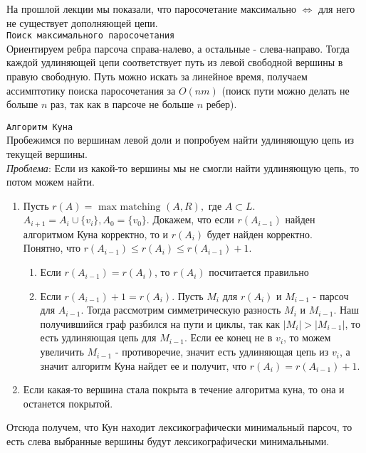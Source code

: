 \documentclass{article}
\newcommand{\ti}[1]{\textit{#1}}
\newcommand{\abs}[1]{\left|{#1}\right|}
\begin{document}
На прошлой лекции мы показали, что паросочетание максимально $\Leftrightarrow$ для него не существует дополняющей цепи. \\

\verb'Поиск максимального паросочетания' \\
Ориентируем ребра парсоча справа-налево, а остальные - слева-направо. Тогда каждой удлиняющей цепи соответствует путь из левой свободной вершины в правую свободную. Путь можно искать за линейное время, получаем ассимптотику поиска паросочетания за $O(nm)$ (поиск пути можно делать не больше $n$ раз, так как в парсоче не больше $n$ ребер).

\verb'Алгоритм Куна' \\
Пробежимся по вершинам левой доли и попробуем найти удлиняющую цепь из текущей вершины. \\
\ti{Проблема}: Если из какой-то вершины мы не смогли найти удлиняющую цепь, то потом можем найти. \\
\begin{enumerate}
	\item Пусть $r(A) = \text{ max matching } (A, R), \text{ где } A \subset L$. $A_{i + 1} = A_i \cup \{v_i\}, A_0 = \{v_0\}$. Докажем, что если $r(A_{i-1})$ найден алгоритмом Куна корректно, то и $r(A_i)$ будет найден корректно. \\
	Понятно, что $r(A_{i-1}) \le r(A_i) \le r(A_{i-1}) + 1$.
	\begin{enumerate}
	\item Если $r(A_{i-1}) = r(A_i)$, то $r(A_i)$ посчитается правильно \\
	\item Если $r(A_{i-1}) + 1 = r(A_i)$. Пусть $M_i$ для $r(A_i)$ и $M_{i-1}$ - парсоч для $A_{i-1}$. Тогда рассмотрим симметрическую разность $M_i$ и $M_{i-1}$. Наш получившийся граф разбился на пути и циклы, так как $\abs{M_i} > \abs{M_{i-1}}$, то есть удлиняющая цепь для $M_{i-1}$. Если ее конец не в $v_i$, то можем увеличить $M_{i-1}$ - противоречие, значит есть удлиняющая цепь из $v_i$, а значит алгоритм Куна найдет ее и получит, что $r(A_i) = r(A_{i-1}) + 1$.
	\end{enumerate}
	\item Если какая-то вершина стала покрыта в течение алгоритма куна, то она и останется покрытой. \\
\end{enumerate}
Отсюда получем, что Кун находит лексикографически минимальный парсоч, то есть слева выбранные вершины будут лексикографически минимальными. \\
\end{document}

